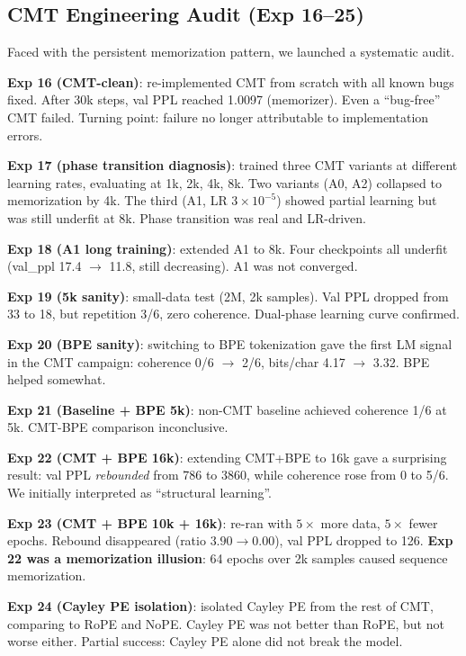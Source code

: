 \documentclass{article}
\begin{document}
\subsection{CMT Engineering Audit (Exp 16--25)}

Faced with the persistent memorization pattern, we launched a systematic audit.

\textbf{Exp 16 (CMT-clean)}: re-implemented CMT from scratch with all known bugs fixed. After 30k steps, val PPL reached 1.0097 (memorizer). Even a ``bug-free'' CMT failed. Turning point: failure no longer attributable to implementation errors.

\textbf{Exp 17 (phase transition diagnosis)}: trained three CMT variants at different learning rates, evaluating at 1k, 2k, 4k, 8k. Two variants (A0, A2) collapsed to memorization by 4k. The third (A1, LR $3 \times 10^{-5}$) showed partial learning but was still underfit at 8k. Phase transition was real and LR-driven.

\textbf{Exp 18 (A1 long training)}: extended A1 to 8k. Four checkpoints all underfit (val\_ppl 17.4 $\to$ 11.8, still decreasing). A1 was not converged.

\textbf{Exp 19 (5k sanity)}: small-data test (2M, 2k samples). Val PPL dropped from 33 to 18, but repetition 3/6, zero coherence. Dual-phase learning curve confirmed.

\textbf{Exp 20 (BPE sanity)}: switching to BPE tokenization gave the first LM signal in the CMT campaign: coherence 0/6 $\to$ 2/6, bits/char 4.17 $\to$ 3.32. BPE helped somewhat.

\textbf{Exp 21 (Baseline + BPE 5k)}: non-CMT baseline achieved coherence 1/6 at 5k. CMT-BPE comparison inconclusive.

\textbf{Exp 22 (CMT + BPE 16k)}: extending CMT+BPE to 16k gave a surprising result: val PPL \emph{rebounded} from 786 to 3860, while coherence rose from 0 to 5/6. We initially interpreted as ``structural learning''.

\textbf{Exp 23 (CMT + BPE 10k + 16k)}: re-ran with $5\times$ more data, $5\times$ fewer epochs. Rebound disappeared (ratio $3.90 \to 0.00$), val PPL dropped to 126. \textbf{Exp 22 was a memorization illusion}: 64 epochs over 2k samples caused sequence memorization.

\textbf{Exp 24 (Cayley PE isolation)}: isolated Cayley PE from the rest of CMT, comparing to RoPE and NoPE. Cayley PE was not better than RoPE, but not worse either. Partial success: Cayley PE alone did not break the model.
\end{document}
